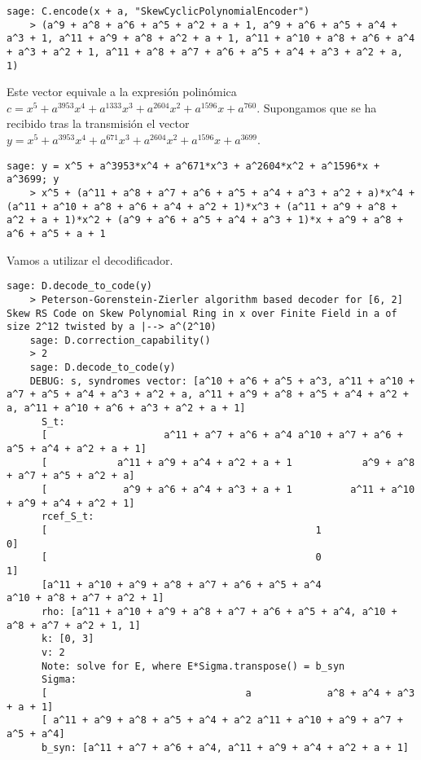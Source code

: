 \begin{example}
\begin{lstlisting}[gobble=4]
    sage: C.encode(x + a, "SkewCyclicPolynomialEncoder")
    > (a^9 + a^8 + a^6 + a^5 + a^2 + a + 1, a^9 + a^6 + a^5 + a^4 + a^3 + 1, a^11 + a^9 + a^8 + a^2 + a + 1, a^11 + a^10 + a^8 + a^6 + a^4 + a^3 + a^2 + 1, a^11 + a^8 + a^7 + a^6 + a^5 + a^4 + a^3 + a^2 + a, 1)
  \end{lstlisting}
  Este vector equivale a la expresión polinómica \(c = x^5 + a^{3953}x^4 + a^{1333}x^3 + a^{2604}x^2 + a^{1596}x + a^{760}\).
  Supongamos que se ha recibido tras la transmisión el vector \(y = x^5 + a^{3953}x^4 + a^{671}x^3 + a^{2604}x^2 + a^{1596}x + a^{3699}\).
  \begin{lstlisting}[gobble=4]
    sage: y = x^5 + a^3953*x^4 + a^671*x^3 + a^2604*x^2 + a^1596*x + a^3699; y
    > x^5 + (a^11 + a^8 + a^7 + a^6 + a^5 + a^4 + a^3 + a^2 + a)*x^4 + (a^11 + a^10 + a^8 + a^6 + a^4 + a^2 + 1)*x^3 + (a^11 + a^9 + a^8 + a^2 + a + 1)*x^2 + (a^9 + a^6 + a^5 + a^4 + a^3 + 1)*x + a^9 + a^8 + a^6 + a^5 + a + 1
  \end{lstlisting}
  Vamos a utilizar el decodificador.
  \begin{lstlisting}[gobble=4, basicstyle=\small\ttfamily]
    sage: D.decode_to_code(y)
    > Peterson-Gorenstein-Zierler algorithm based decoder for [6, 2] Skew RS Code on Skew Polynomial Ring in x over Finite Field in a of size 2^12 twisted by a |--> a^(2^10)
    sage: D.correction_capability()
    > 2
    sage: D.decode_to_code(y)
    DEBUG: s, syndromes vector: [a^10 + a^6 + a^5 + a^3, a^11 + a^10 + a^7 + a^5 + a^4 + a^3 + a^2 + a, a^11 + a^9 + a^8 + a^5 + a^4 + a^2 + a, a^11 + a^10 + a^6 + a^3 + a^2 + a + 1]
      S_t:
      [                    a^11 + a^7 + a^6 + a^4 a^10 + a^7 + a^6 + a^5 + a^4 + a^2 + a + 1]
      [            a^11 + a^9 + a^4 + a^2 + a + 1            a^9 + a^8 + a^7 + a^5 + a^2 + a]
      [             a^9 + a^6 + a^4 + a^3 + a + 1          a^11 + a^10 + a^9 + a^4 + a^2 + 1]
      rcef_S_t:
      [                                              1                                               0]
      [                                              0                                               1]
      [a^11 + a^10 + a^9 + a^8 + a^7 + a^6 + a^5 + a^4                      a^10 + a^8 + a^7 + a^2 + 1]
      rho: [a^11 + a^10 + a^9 + a^8 + a^7 + a^6 + a^5 + a^4, a^10 + a^8 + a^7 + a^2 + 1, 1]
      k: [0, 3]
      v: 2
      Note: solve for E, where E*Sigma.transpose() = b_syn
      Sigma:
      [                                  a             a^8 + a^4 + a^3 + a + 1]
      [ a^11 + a^9 + a^8 + a^5 + a^4 + a^2 a^11 + a^10 + a^9 + a^7 + a^5 + a^4]
      b_syn: [a^11 + a^7 + a^6 + a^4, a^11 + a^9 + a^4 + a^2 + a + 1]

\end{lstlisting}
\end{example}
